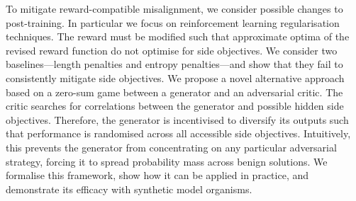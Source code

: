 


To mitigate reward-compatible misalignment, we consider possible changes to post-training. In particular we focus on reinforcement learning regularisation techniques. The reward must be modified such that approximate optima of the revised reward function do not optimise for side objectives. We consider two baselines---length penalties and entropy penalties---and show that they fail to consistently mitigate side objectives. 
We propose a novel alternative approach based on a zero-sum game between a generator and an adversarial critic. The critic searches for correlations between the generator and possible hidden side objectives. Therefore, the generator is incentivised to diversify its outputs such that performance is randomised across all accessible side objectives. Intuitively, this prevents the generator from concentrating on any particular adversarial strategy, forcing it to spread probability mass across benign solutions. We formalise this framework, show how it can be applied in practice, and demonstrate its efficacy with synthetic model organisms.

